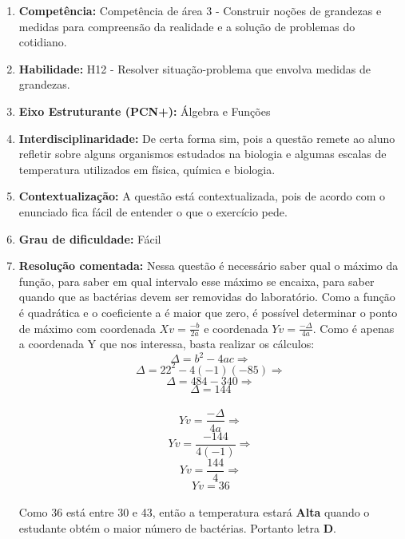 \documentclass[a4paper, 12pt]{article}
\begin{document}
\begin{enumerate}
  \begin{enumerate}
  \item \textbf{Competência: }
    Competência de área 3 - Construir noções de grandezas e medidas para compreensão da realidade e a solução de problemas do cotidiano.
  \item \textbf{Habilidade: }
    H12 - Resolver situação-problema que envolva medidas de grandezas.
  \item \textbf{Eixo Estruturante (PCN+): }
    Álgebra e Funções
  \item \textbf{Interdisciplinaridade: }
    De certa forma sim, pois a questão remete ao aluno refletir sobre alguns organismos estudados na biologia e algumas escalas de temperatura utilizados em física, química e biologia.
  \item \textbf{Contextualização: }
    A questão está contextualizada, pois de acordo com o enunciado fica fácil de entender o que o exercício pede.
  \item \textbf{Grau de dificuldade: }
    Fácil
  \item \textbf{Resolução comentada: }
    Nessa questão é necessário saber qual o máximo da função, para saber em qual intervalo esse máximo se encaixa, para saber quando que as bactérias devem ser removidas do laboratório. Como a função é quadrática e o coeficiente a é maior que zero, é possível determinar o ponto de máximo com coordenada $Xv=\frac{-b}{2a}$ e coordenada $Yv=\frac{-\Delta}{4a}$. Como é apenas a coordenada Y que nos interessa, basta realizar os cálculos:
    $$ \Delta = b^{2}-4ac \Rightarrow $$
    $$ \Delta = 22^{2}-4(-1)(-85) \Rightarrow $$
    $$ \Delta = 484-340 \Rightarrow $$
    $$ \boxed{\Delta = 144} $$\\

    $$Yv = \frac{-\Delta}{4a} \Rightarrow $$
    $$Yv = \frac{-144}{4(-1)} \Rightarrow $$
    $$Yv = \frac{144}{4} \Rightarrow $$
    $$\boxed{Yv = 36} $$\\
  Como 36 está entre 30 e 43, então a temperatura estará \textbf{Alta} quando o estudante obtém o maior número de bactérias. Portanto letra \textbf{D}.
    

\end{enumerate}
\end{enumerate}
\end{document}

